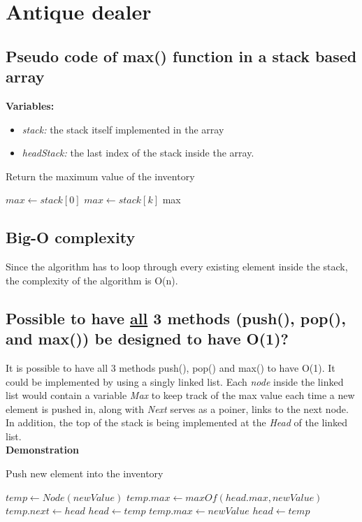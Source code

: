 \documentclass[16pt, letterpaper]{article}
\begin{document}
\section{Antique dealer}
\subsection{Pseudo code of max() function in a stack based array}
\textbf{Variables:}
\begin{itemize}
    \item \textit{stack:} the stack itself implemented in the array
    \item \textit{headStack:} the last index of the stack inside the array.
\end{itemize}
\begin{algorithm} [H]
\caption{Return the maximum value of the inventory}
\begin{algorithmic}[1]
    \State $max \gets stack[0]$
    \State $max \gets stack[k]$
    \EndIf
    \EndFor
    \State \Return max
    \EndProcedure
\end{algorithmic}
\end{algorithm}

\subsection{Big-O complexity}
Since the algorithm has to loop through every existing element inside the stack, the complexity of the algorithm is O(n).

\subsection{Possible to have \underline{all}  3 methods (push(), pop(), and max()) be designed to have O(1)?}
It is possible to have all 3 methods push(), pop() and max() to have O(1). It could be implemented by using a singly linked list. Each \textit{node} inside the linked list would contain a variable \emph{Max} to keep track of the max value each time a new element is pushed in, along with \emph{Next} serves as a poiner, links to the next node. 
In addition, the top of the stack is being implemented at the \textit{Head} of the linked list.
\\
\textbf{Demonstration}
\begin{algorithm} [H]
\caption{Push new element into the inventory}
\begin{algorithmic}[1]
    \State $temp \gets Node(newValue)$ 
    \State $temp.max \gets maxOf(head.max, newValue)$
    \State $temp.next \gets head$
    \State $head \gets temp$
    \Else{}
    \State $temp.max \gets newValue$ 
    \State $head \gets temp$
    \EndIf
    \EndProcedure
\end{algorithmic}
\end{algorithm}
\end{document}

